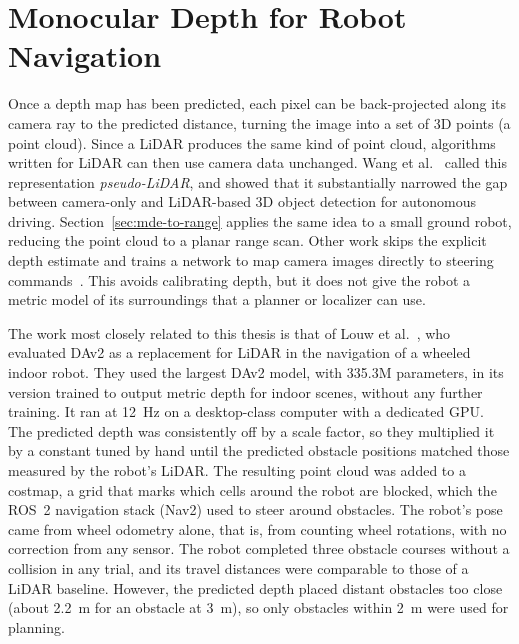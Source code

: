 \section{Monocular Depth for Robot Navigation}
\label{sec:rw-mde-nav}

Once a depth map has been predicted, each pixel can be back-projected along its camera ray to the
predicted distance, turning the image into a set of 3D points (a point cloud). Since a LiDAR
produces the same kind of point cloud, algorithms written for LiDAR can then use camera data unchanged. Wang et al.~\cite{wang2019pseudo} called this
representation \emph{pseudo-LiDAR}, and showed that it substantially narrowed the gap between
camera-only and LiDAR-based 3D object detection for autonomous driving.
Section~\ref{sec:mde-to-range} applies the same idea to a small ground robot, reducing the point
cloud to a planar range scan. Other work skips the explicit depth estimate and trains a network to
map camera images directly to steering commands~\cite{bojarski2016end}. This avoids calibrating depth, but it
does not give the robot a metric model of its surroundings that a planner or localizer can
use.

The work most closely related to this thesis is that of Louw et al.~\cite{practical}, who evaluated DAv2 as a replacement for LiDAR in the navigation of a wheeled indoor robot.
They used the largest DAv2 model, with 335.3M parameters, in its version trained to output metric depth for indoor scenes, without any further training.
It ran at 12~Hz on a desktop-class computer with a dedicated GPU.
The predicted depth was consistently off by a scale factor, so they multiplied it by a constant tuned by hand until the predicted obstacle positions matched those measured by the robot's LiDAR.
The resulting point cloud was added to a costmap, a grid that marks which cells around the robot are blocked, which the ROS~2 navigation stack (Nav2) used to steer around obstacles.
The robot's pose came from wheel odometry alone, that is, from counting wheel rotations, with no correction from any sensor.
The robot completed three obstacle courses without a collision in any trial, and its travel distances were comparable to those of a LiDAR baseline.
However, the predicted depth placed distant obstacles too close (about 2.2~m for an obstacle at 3~m), so only obstacles within 2~m were used for planning.

